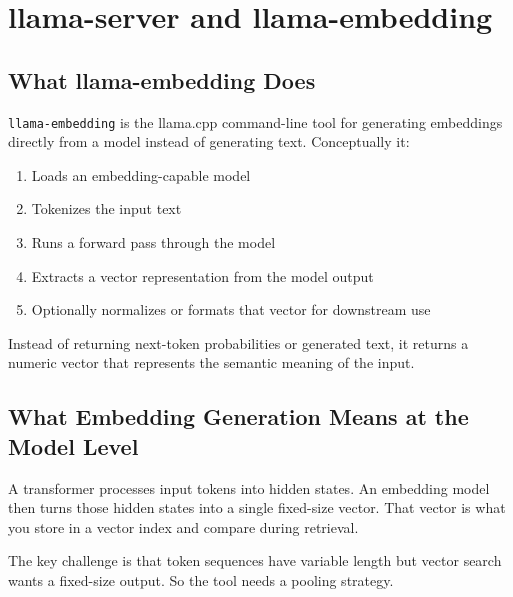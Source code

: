 \chapter{llama-server and llama-embedding}
\label{ch:llama-server}

\section{What llama-embedding Does}

\texttt{llama-embedding} is the llama.cpp command-line tool for generating embeddings
directly from a model instead of generating text. Conceptually it:

\begin{enumerate}
    \item Loads an embedding-capable model
    \item Tokenizes the input text
    \item Runs a forward pass through the model
    \item Extracts a vector representation from the model output
    \item Optionally normalizes or formats that vector for downstream use
\end{enumerate}

Instead of returning next-token probabilities or generated text, it returns a numeric vector
that represents the semantic meaning of the input.

\section{What Embedding Generation Means at the Model Level}

A transformer processes input tokens into hidden states. An embedding model then turns those
hidden states into a single fixed-size vector. That vector is what you store in a vector index
and compare during retrieval.

The key challenge is that token sequences have variable length but vector search wants a
fixed-size output. So the tool needs a pooling strategy.

